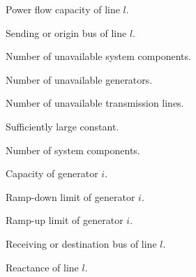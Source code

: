 \begin{description}
\item[$\overline{F}_{l}$] Power flow capacity of line $l$.

\item[$fr(l)$] Sending or origin bus of line $l$.

\item[$K$] Number of unavailable system components.

\item[$K^G$] Number of unavailable generators.

\item[$K^L$] Number of unavailable transmission lines.

\item[${M}_{l}$] Sufficiently large constant.

\item[${n}$] Number of system components.

\item[$\overline{P}_{i}$] Capacity of generator $i$.

\item[$R^{D}_{i}$] Ramp-down limit of generator $i$.
\vspace{0.1cm}

\item[$R^{U}_{i}$] Ramp-up limit of generator $i$.

\item[$to(l)$] Receiving or destination bus of line $l$.

\item[${x}_{l}$] Reactance of line $l$.

\end{description}

